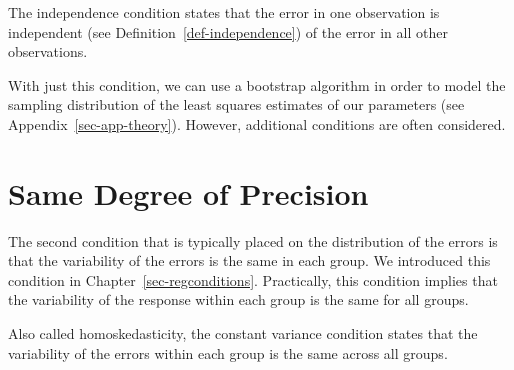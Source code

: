 \documentclass[
  letterpaper,
  DIV=11,
  numbers=noendperiod]{scrreprt}
\theoremstyle{plain}
\theoremstyle{definition}
\theoremstyle{definition}
\theoremstyle{remark}
\begin{document}
\begin{tcolorbox}[enhanced jigsaw, breakable, titlerule=0mm, colframe=quarto-callout-note-color-frame, bottomtitle=1mm, opacityback=0, rightrule=.15mm, toptitle=1mm, arc=.35mm, bottomrule=.15mm, left=2mm, title=\textcolor{quarto-callout-note-color}{\faInfo}\hspace{0.5em}{Independence Condition}, leftrule=.75mm, coltitle=black, toprule=.15mm, colbacktitle=quarto-callout-note-color!10!white, colback=white, opacitybacktitle=0.6]

The independence condition states that the error in one observation is
independent (see Definition~\ref{def-independence}) of the error in all
other observations.

\end{tcolorbox}

With just this condition, we can use a bootstrap algorithm in order to
model the sampling distribution of the least squares estimates of our
parameters (see Appendix~\ref{sec-app-theory}). However, additional
conditions are often considered.

\section{Same Degree of Precision}\label{same-degree-of-precision-1}

The second condition that is typically placed on the distribution of the
errors is that the variability of the errors is the same in each group.
We introduced this condition in Chapter~\ref{sec-regconditions}.
Practically, this condition implies that the variability of the response
within each group is the same for all groups.

\begin{tcolorbox}[enhanced jigsaw, breakable, titlerule=0mm, colframe=quarto-callout-note-color-frame, bottomtitle=1mm, opacityback=0, rightrule=.15mm, toptitle=1mm, arc=.35mm, bottomrule=.15mm, left=2mm, title=\textcolor{quarto-callout-note-color}{\faInfo}\hspace{0.5em}{Constant Variance}, leftrule=.75mm, coltitle=black, toprule=.15mm, colbacktitle=quarto-callout-note-color!10!white, colback=white, opacitybacktitle=0.6]

Also called homoskedasticity, the constant variance condition states
that the variability of the errors within each group is the same across
all groups.

\end{tcolorbox}
\end{document}

